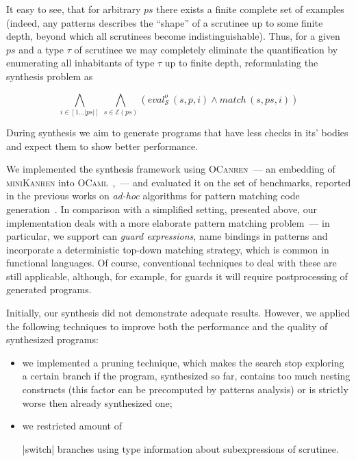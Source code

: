 \documentclass[submission,copyright,creativecommons]{eptcs}
\newcommand*{\SavedLstInline}{}
\DeclareRobustCommand*{\lstinline}{%
  \ifmmode
    \let\SavedBGroup\bgroup
    \def\bgroup{%
      \let\bgroup\SavedBGroup
      \hbox\bgroup
    }%
  \fi
  \SavedLstInline
}
\newcommand{\ir}{\ensuremath{\mathcal{S}}}
\begin{document}
It easy to see, that for arbitrary $ps$ there exists a finite complete set of examples (indeed, any patterns describes the ``shape''
of a scrutinee up to some finite depth, beyond which all scrutinees become indistinguishable). Thus, for a given $ps$ and a type $\tau$ of scrutinee we may
completely eliminate the quantification by enumerating all inhabitants of type $\tau$ up to finite depth, reformulating the synthesis problem as

\[
\bigwedge_{i\in[1\dots|ps|]}\,\bigwedge_{s\in\mathcal{E}(ps)} (eval^o_{\ir}\, (s, p, i) \wedge match\, (s, ps, i))
\]

During synthesis we aim to generate programs that have less checks in its' bodies and expect them to show better performance.

We implemented the synthesis framework using \textsc{OCanren}~--- an embedding of \textsc{miniKanren} into \textsc{OCaml}~\cite{ocanren},~---
and evaluated it on the set of benchmarks, reported in the previous works on \emph{ad-hoc} algorithms for pattern matching
code generation~\cite{maranget2001,maranget2008}. In comparison with a simplified setting, presented above, our implementation
deals with a more elaborate pattern matching problem~--- in particular, we support can \emph{guard expressions}, name bindings in
patterns and incorporate a deterministic top-down matching strategy, which is common in functional languages. Of course, conventional techniques to deal with these are still applicable, although, for example, for guards it will require postprocessing of generated programs.

Initially, our synthesis did not demonstrate adequate results. However, we applied the following techniques to improve both the performance
and the quality of synthesized programs:

\begin{itemize}
\item we implemented a pruning technique, which makes the search stop exploring a certain branch if the program, synthesized so far,
  contains too much nesting constructs (this factor can be precomputed by patterns analysis) or is strictly worse then already synthesized one;
  
\item we restricted amount of \lstinline|switch| branches using type information about subexpressions of scrutinee.
\end{itemize}
\end{document}
